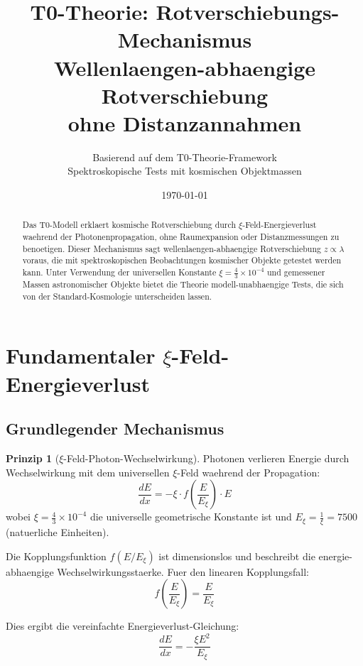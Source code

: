 \documentclass[12pt,a4paper]{article}
\title{\Huge\textbf{T0-Theorie: Rotverschiebungs-Mechanismus}\\
	\Large Wellenlaengen-abhaengige Rotverschiebung \\
	ohne Distanzannahmen}
\author{Basierend auf dem T0-Theorie-Framework\\
	Spektroskopische Tests mit kosmischen Objektmassen}
\date{\today}
\newcommand{\xiconst}{\xi = \frac{4}{3} \times 10^{-4}}
\newcommand{\Exi}{E_\xi}
\theoremstyle{definition}
\newtheorem{prinzip}{Prinzip}
\begin{document}
	
	\maketitle
	
	\begin{abstract}
		Das T0-Modell erklaert kosmische Rotverschiebung durch $\xi$-Feld-Energieverlust waehrend der Photonenpropagation, ohne Raumexpansion oder Distanzmessungen zu benoetigen. Dieser Mechanismus sagt wellenlaengen-abhaengige Rotverschiebung $z \propto \lambda$ voraus, die mit spektroskopischen Beobachtungen kosmischer Objekte getestet werden kann. Unter Verwendung der universellen Konstante $\xiconst$ und gemessener Massen astronomischer Objekte bietet die Theorie modell-unabhaengige Tests, die sich von der Standard-Kosmologie unterscheiden lassen.
	\end{abstract}
	
	\tableofcontents
	\newpage
	
	\section{Fundamentaler $\xi$-Feld-Energieverlust}
	
	\subsection{Grundlegender Mechanismus}
	
	\begin{prinzip}[$\xi$-Feld-Photon-Wechselwirkung]
		Photonen verlieren Energie durch Wechselwirkung mit dem universellen $\xi$-Feld waehrend der Propagation:
		\begin{equation}
			\frac{dE}{dx} = -\xi \cdot f\left(\frac{E}{\Exi}\right) \cdot E
		\end{equation}
		wobei $\xiconst$ die universelle geometrische Konstante ist und $\Exi = \frac{1}{\xi} = 7500$ (natuerliche Einheiten).
	\end{prinzip}
	
	Die Kopplungsfunktion $f(E/\Exi)$ ist dimensionslos und beschreibt die energie-abhaengige Wechselwirkungsstaerke. Fuer den linearen Kopplungsfall:
	\begin{equation}
		f\left(\frac{E}{\Exi}\right) = \frac{E}{\Exi}
	\end{equation}
	
	Dies ergibt die vereinfachte Energieverlust-Gleichung:
	\begin{equation}
		\frac{dE}{dx} = -\frac{\xi E^2}{\Exi}
	\end{equation}
	
\end{document}
